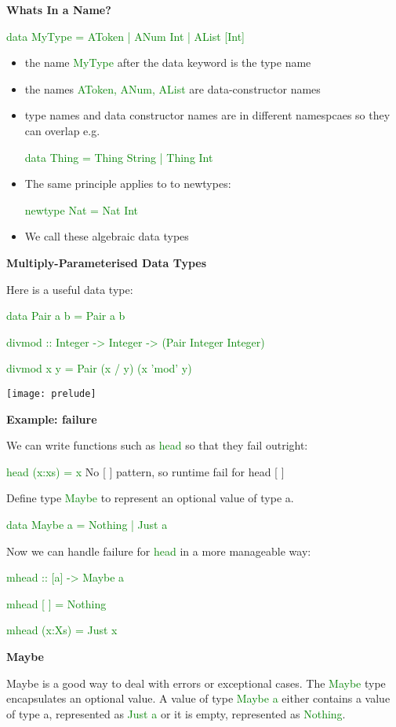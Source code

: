 \documentclass{article}
\begin{document}
\textbf{Whats In a Name?}

\textcolor{green}{data MyType = AToken | ANum Int | AList [Int]}

\begin{itemize}
\item the name \textcolor{green}{MyType} after the data keyword is the type name
\item the names \textcolor{green}{AToken, ANum, AList} are data-constructor names
\item type names and data constructor names are in different namespcaes so they can overlap e.g.

\textcolor{green}{ data Thing = Thing String | Thing Int}

\item The same principle applies to to newtypes:

\textcolor{green}{newtype Nat = Nat Int}

\item We call these algebraic data types
\end{itemize}


\textbf{Multiply-Parameterised Data Types}

Here is a useful data type:

\textcolor{green}{data Pair a b = Pair a b}

\textcolor{green}{divmod :: Integer -> Integer -> (Pair Integer Integer)}

\textcolor{green}{divmod x y = Pair (x / y) (x 'mod' y)}

\texttt{[image: prelude]}

\textbf{Example: failure}

We can write functions such as \textcolor{green}{head} so that they fail outright:

\textcolor{green}{head (x:xs) = x} No [ ] pattern, so runtime fail for head [ ]

Define type \textcolor{green}{Maybe} to represent an optional value of type a.

\textcolor{green}{data Maybe a = Nothing | Just a}

Now we can handle failure for \textcolor{green}{head} in a more manageable way:

\textcolor{green}{mhead :: [a] -> Maybe a}

\textcolor{green}{mhead [ ] = Nothing}

\textcolor{green}{mhead (x:Xs) = Just x}

\textbf{Maybe}

Maybe is a good way to deal with errors or exceptional cases. The \textcolor{green}{Maybe} type encapsulates an optional value. A value of type \textcolor{green}{Maybe a} either contains a value of type a, represented as \textcolor{green}{Just a} or it is empty, represented as \textcolor{green}{Nothing}.
\end{document}
